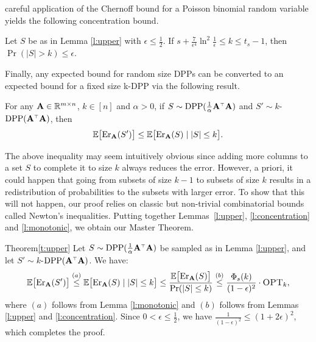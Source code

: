 \documentclass{article}
\begin{document}
careful application of the Chernoff bound for a Poisson binomial
random variable yields the following concentration bound.
\begin{lemma}\label{l:concentration}
Let $S$ be as in Lemma \ref{l:upper} with $\epsilon\leq \frac12$.
If $s+\frac7{\epsilon^4}\ln^2\!\frac1\epsilon \leq k\leq t_s-1$, then
$\Pr(|S|>k) \leq \epsilon$.
\end{lemma}
Finally, any expected bound for random size DPPs can be converted to
an expected bound for a fixed size k-DPP via the following
result.
\begin{lemma}\label{l:monotonic}
  For any $\mathbf A\in\mathbb R^{m\times n}$, $k\in[n]$ and $\alpha>0$, if
  $S\sim\DPP(\frac1\alpha\A^\top\A)$ and $S'\sim k$-$\DPP(\A^\top\A)$,
  then %
  \begin{align*}
    \mathbb E\big[\mathrm{Er}_\mathbf A(S')\big] \leq \mathbb E\big[\mathrm{Er}_\mathbf A(S)\mid |S|\leq k\big].
  \end{align*}
\end{lemma}
The above inequality may seem intuitively obvious since adding more columns
to a set $S$ to complete it to size $k$ always reduces the
error. However, a priori, it could happen that going from subsets 
of size $k-1$ to subsets of size $k$ results in a redistribution of
probabilities to the subsets with larger error. To show that this will
not happen, our proof relies on classic but non-trivial combinatorial
bounds called Newton's inequalities. Putting together
Lemmas~\ref{l:upper}, \ref{l:concentration} and
\ref{l:monotonic}, we obtain our Master Theorem.
\begin{proofof}{Theorem}{\ref{t:upper}}
Let $S\sim\DPP(\frac1\alpha\A^\top\A)$ be sampled as in Lemma
\ref{l:upper}, and let $S'\sim k$-$\DPP(\A^\top\A)$. We have:\vspace{-2mm}
\begin{align*}
  \mathbb E\big[\mathrm{Er}_\mathbf A(S')\big]
\overset{(a)}{\leq} \mathbb E\big[\mathrm{Er}_\mathbf A(S)\mid|S|\leq k\big]
  \leq \frac{\mathbb E\big[\mathrm{Er}_\mathbf A(S)\big]}{\mathrm{Pr}(|S|\leq k)}
  \overset{(b)}{\leq} \frac{\Phi_s(k)}{(1-\epsilon)^2}\cdot{\textsc{OPT}_k},
\end{align*}
where $(a)$ follows from Lemma \ref{l:monotonic} and $(b)$ follows
from Lemmas \ref{l:upper} and \ref{l:concentration}. Since
$0<\epsilon\leq\frac12$, we have
$\frac1{(1-\epsilon)^2}\leq(1+2\epsilon)^2$, which completes the proof.
\end{proofof}
\end{document}
